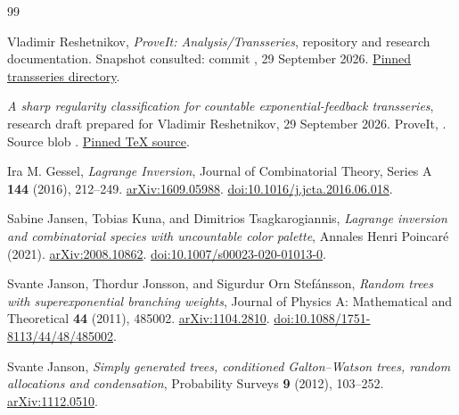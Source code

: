 \documentclass[11pt,a4paper]{article}
\numberwithin{equation}{section}
\theoremstyle{definition}
\theoremstyle{remark}
\begin{document}
\begin{thebibliography}{99}

Vladimir Reshetnikov, \emph{ProveIt: Analysis/Transseries}, repository and
research documentation. Snapshot consulted: commit
,
29 September 2026.
\href{https://github.com/VladimirReshetnikov/ProveIt/tree/5804c7aff9955e6cbc09be2a71a295a07b238bc9/Analysis/Transseries}{Pinned transseries directory}.

\emph{A sharp regularity classification for countable exponential-feedback
transseries}, research draft prepared for Vladimir Reshetnikov,
29 September 2026. ProveIt,
.
Source blob .
\href{https://github.com/VladimirReshetnikov/ProveIt/blob/5804c7aff9955e6cbc09be2a71a295a07b238bc9/Analysis/Transseries/docs/series-and-transseries/Exponential_Feedback_Regularity_Classification/article.tex}{Pinned TeX source}.

Ira M. Gessel, \emph{Lagrange Inversion}, Journal of Combinatorial Theory,
Series A \textbf{144} (2016), 212--249.
\href{https://arxiv.org/abs/1609.05988}{arXiv:1609.05988}.
\href{https://doi.org/10.1016/j.jcta.2016.06.018}{doi:10.1016/j.jcta.2016.06.018}.

Sabine Jansen, Tobias Kuna, and Dimitrios Tsagkarogiannis,
\emph{Lagrange inversion and combinatorial species with uncountable color
palette}, Annales Henri Poincar\'e (2021).
\href{https://arxiv.org/abs/2008.10862}{arXiv:2008.10862}.
\href{https://doi.org/10.1007/s00023-020-01013-0}{doi:10.1007/s00023-020-01013-0}.

Svante Janson, Thordur Jonsson, and Sigurdur Orn Stef\'ansson,
\emph{Random trees with superexponential branching weights},
Journal of Physics A: Mathematical and Theoretical \textbf{44} (2011),
485002.
\href{https://arxiv.org/abs/1104.2810}{arXiv:1104.2810}.
\href{https://doi.org/10.1088/1751-8113/44/48/485002}{doi:10.1088/1751-8113/44/48/485002}.

Svante Janson, \emph{Simply generated trees, conditioned Galton--Watson
trees, random allocations and condensation}, Probability Surveys
\textbf{9} (2012), 103--252.
\href{https://arxiv.org/abs/1112.0510}{arXiv:1112.0510}.


\end{thebibliography}
\end{document}
